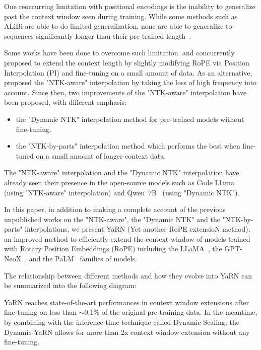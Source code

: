 One reoccurring limitation with positional encodings is the inability to generalize past the context window seen during training. While some methods such as ALiBi are able to do limited generalization, none are able to generalize to sequences significantly longer than their pre-trained length~\citep{kazemnejad2023impact}.

Some works have been done to overcome such limitation. \citep{chen2023extending} and concurrently~\citep{kaiokendev} proposed to extend the context length by slightly modifying RoPE via Position Interpolation (PI) and fine-tuning on a small amount of data. As an alternative, \citep{blocntkaware} proposed the "NTK-aware" interpolation by taking the loss of high frequency into account. Since then, two improvements of the "NTK-aware" interpolation have been proposed, with different emphasis:

\begin{itemize}
    \item the "Dynamic NTK" interpolation method \citep{emozillareddit} for pre-trained models without fine-tuning.
    \item the "NTK-by-parts" interpolation method \citep{blocntkparts} which performs the best when fine-tuned on a small amount of longer-context data.
\end{itemize}

The "NTK-aware" interpolation and the "Dynamic NTK" interpolation have already seen their presence in the open-source models such as Code Llama~\citep{rozière2023code} (using "NTK-aware" interpolation) and Qwen~7B~\citep{qwen} (using "Dynamic NTK").

In this paper, in addition to making a complete account of the previous unpublished works on the "NTK-aware", the "Dynamic NTK" and the "NTK-by-parts" interpolations, we present YaRN (Yet another RoPE extensioN method), an improved method to efficiently extend the context window of models trained with Rotary Position Embeddings (RoPE) including the  LLaMA~\citep{touvron2023llama}, the GPT-NeoX~\citep{black2022gptneox20b}, and the PaLM~\citep{chowdhery2022palm} families of models.

The relationship between different methods and how they evolve into YaRN can be summarized into the following diagram:

YaRN reaches state-of-the-art performances in context window extensions after fine-tuning on less than $\sim$0.1\% of the original pre-training data. In the meantime, by combining with the inference-time technique called Dynamic Scaling, the Dynamic-YaRN allows for more than 2x context window extension without any fine-tuning.

